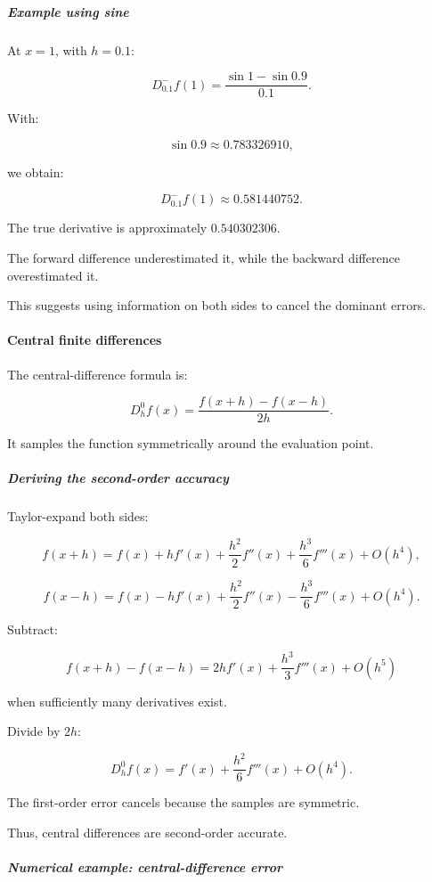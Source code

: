 \subparagraph{Example using sine}\label{02-foundations-ii-ch025-example-using-sine}

At \(x=1\), with \(h=0.1\):

\[
D_{0.1}^-f(1) = \frac{\sin1-\sin0.9}{0.1}.
\]

With:

\[
\sin0.9\approx0.783326910,
\]

we obtain:

\[
\boxed{ D_{0.1}^-f(1)\approx0.581440752 }.
\]

The true derivative is approximately \(0.540302306\).

The forward difference underestimated it, while the backward difference overestimated it.

This suggests using information on both sides to cancel the dominant errors.

\paragraph{Central finite differences}\label{02-foundations-ii-ch025-central-finite-differences}

The central-difference formula is:

\[
\boxed{ D_h^0f(x)= \frac{f(x+h)-f(x-h)}{2h} }.
\]

It samples the function symmetrically around the evaluation point.

\subparagraph{Deriving the second-order accuracy}\label{02-foundations-ii-ch025-deriving-the-second-order-accuracy}

Taylor-expand both sides:

\[
f(x+h)= f(x)+hf'(x)+ \frac{h^2}{2}f''(x)+ \frac{h^3}{6}f'''(x)+O(h^4),
\]

\[
f(x-h)= f(x)-hf'(x)+ \frac{h^2}{2}f''(x)- \frac{h^3}{6}f'''(x)+O(h^4).
\]

Subtract:

\[
f(x+h)-f(x-h) = 2hf'(x)+\frac{h^3}{3}f'''(x)+O(h^5)
\]

when sufficiently many derivatives exist.

Divide by \(2h\):

\[
\boxed{ D_h^0f(x) = f'(x)+ \frac{h^2}{6}f'''(x)+O(h^4) }.
\]

The first-order error cancels because the samples are symmetric.

Thus, central differences are second-order accurate.

\subparagraph{Numerical example: central-difference error}\label{02-foundations-ii-ch025-numerical-example-central-difference-error}

